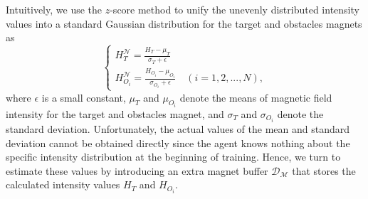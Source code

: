 \documentclass[journal]{IEEEtran}
\begin{document}
Intuitively, we use the $z$-score method to unify the unevenly distributed intensity values into a standard Gaussian distribution for the target and obstacles magnets as
\begin{equation}
\left\{\begin{array}{lr}
    H_{T}^{\mathcal{N}} = \frac{H_{T}-\mu_{T}}{\sigma_{T} + \epsilon} \\
    H_{O_i}^{\mathcal{N}} = \frac{H_{O_i}-\mu_{O_i}}{\sigma_{O_i} + \epsilon} \quad (i=1,2,...,N),
\end{array}\right.
\label{std-h}
\end{equation}
where $\epsilon$ is a small constant, $\mu_{T}$ and $\mu_{O_i}$ denote the means of magnetic field intensity for the target and obstacles magnet, and $\sigma_{T}$ and $\sigma_{O_i}$ denote the standard deviation. 
Unfortunately, the actual values of the mean and standard deviation cannot be obtained directly since the agent knows nothing about the specific intensity distribution at the beginning of training.
Hence, we turn to estimate these values by introducing an extra magnet buffer $\mathcal{D}_\mathcal{M}$ that stores the calculated intensity values $H_{T}$ and $H_{O_i}$.
\end{document}
